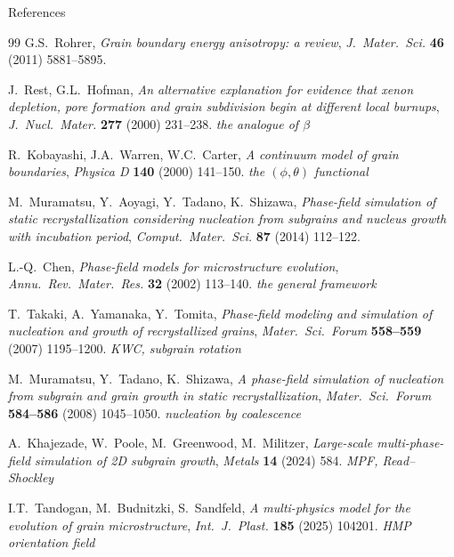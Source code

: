 \documentclass[10pt,aspectratio=169]{beamer}
\begin{document}
\begin{frame}[allowframebreaks]{References}
\begin{thebibliography}{99}
     G.S.\ Rohrer,
      \emph{Grain boundary energy anisotropy: a review},
      \emph{J.\ Mater.\ Sci.} \textbf{46} (2011) 5881--5895.

     J.\ Rest, G.L.\ Hofman,
      \emph{An alternative explanation for evidence that xenon depletion, pore formation and
      grain subdivision begin at different local burnups},
      \emph{J.\ Nucl.\ Mater.} \textbf{277} (2000) 231--238.
      \hfill{\itshape the analogue of $\beta$}

     R.\ Kobayashi, J.A.\ Warren, W.C.\ Carter,
      \emph{A continuum model of grain boundaries},
      \emph{Physica D} \textbf{140} (2000) 141--150.
      \hfill{\itshape the $(\phi,\theta)$ functional}

     M.\ Muramatsu, Y.\ Aoyagi, Y.\ Tadano, K.\ Shizawa,
      \emph{Phase-field simulation of static recrystallization considering nucleation from
      subgrains and nucleus growth with incubation period},
      \emph{Comput.\ Mater.\ Sci.} \textbf{87} (2014) 112--122.

     L.-Q.\ Chen,
      \emph{Phase-field models for microstructure evolution},
      \emph{Annu.\ Rev.\ Mater.\ Res.} \textbf{32} (2002) 113--140.
      \hfill{\itshape the general framework}

     T.\ Takaki, A.\ Yamanaka, Y.\ Tomita,
      \emph{Phase-field modeling and simulation of nucleation and growth of recrystallized
      grains}, \emph{Mater.\ Sci.\ Forum} \textbf{558--559} (2007) 1195--1200.
      \hfill{\itshape KWC, subgrain rotation}

     M.\ Muramatsu, Y.\ Tadano, K.\ Shizawa,
      \emph{A phase-field simulation of nucleation from subgrain and grain growth in static
      recrystallization}, \emph{Mater.\ Sci.\ Forum} \textbf{584--586} (2008) 1045--1050.
      \hfill{\itshape nucleation by coalescence}

     A.\ Khajezade, W.\ Poole, M.\ Greenwood, M.\ Militzer,
      \emph{Large-scale multi-phase-field simulation of 2D subgrain growth},
      \emph{Metals} \textbf{14} (2024) 584.
      \hfill{\itshape MPF, Read--Shockley}

     I.T.\ Tandogan, M.\ Budnitzki, S.\ Sandfeld,
      \emph{A multi-physics model for the evolution of grain microstructure},
      \emph{Int.\ J.\ Plast.} \textbf{185} (2025) 104201.
      \hfill{\itshape HMP orientation field}


\end{thebibliography}
\end{frame}
\end{document}
